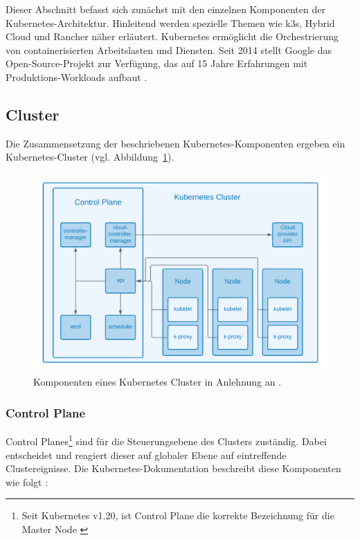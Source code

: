 Dieser Abschnitt befasst sich zunächst mit den einzelnen Komponenten der Kubernetes-Architektur.
Hinleitend werden spezielle Themen wie k3s, Hybrid Cloud und Rancher näher erläutert.
Kubernetes ermöglicht die Orchestrierung von containerisierten Arbeitslasten
und Diensten. Seit 2014 stellt Google das Open-Source-Projekt zur Verfügung,
das auf 15 Jahre Erfahrungen mit Produktions-Workloads aufbaut \cite{kubernetes}.

\subsection{Cluster}
Die Zusammensetzung der beschriebenen Kubernetes-Komponenten ergeben ein Kubernetes-Cluster (vgl. Abbildung~\ref{fig:cluster}).


\begin{figure}[!htb]
    \centering
    \includegraphics[width=1.0\columnwidth]{images/KubernetesKomponenten.png}
    \caption{Komponenten eines Kubernetes Cluster in Anlehnung an \cite{kuberneteskomponenten}.}
    \label{fig:cluster}
\end{figure}

\subsubsection{Control Plane}
Control Planes\footnote{Seit Kubernetes v1.20, ist Control Plane die korrekte Bezeichnung für die Master Node \cite{Kuberneteschangemaster}} sind für die Steuerungsebene des Clusters zuständig.
Dabei entscheidet und reagiert dieser auf globaler Ebene auf eintreffende Clustereignisse.
Die Kubernetes-Dokumentation beschreibt diese Komponenten wie folgt \cite{kuberneteskomponenten}:

